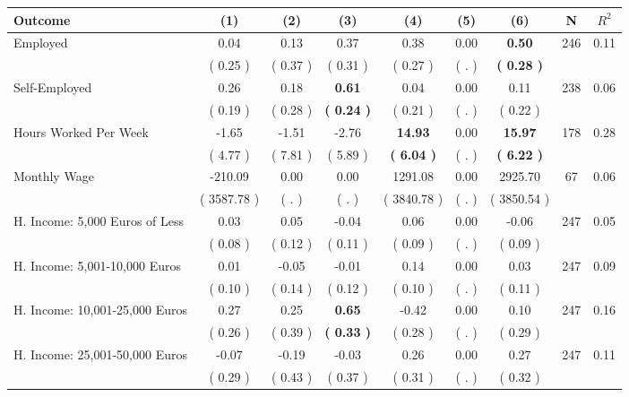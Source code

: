 \begin{tabular}{lcccccccc}
\toprule
 \textbf{Outcome} & \textbf{(1)} & \textbf{(2)} & \textbf{(3)} & \textbf{(4)} & \textbf{(5)} & \textbf{(6)} & \textbf{N} & \textbf{$ R^2$} \\
\midrule
Employed &      0.04 &      0.13 &      0.37 &      0.38 &      0.00 & \textbf{     0.50} & 246 &       0.11 \\ 
 & (     0.25 ) & (     0.37 ) & (     0.31 ) & (     0.27 ) & (        . ) & \textbf{(     0.28 )} & \\
Self-Employed &      0.26 &      0.18 & \textbf{     0.61} &      0.04 &      0.00 &      0.11 & 238 &       0.06 \\ 
 & (     0.19 ) & (     0.28 ) & \textbf{(     0.24 )} & (     0.21 ) & (        . ) & (     0.22 ) & \\
Hours Worked Per Week &     -1.65 &     -1.51 &     -2.76 & \textbf{    14.93} &      0.00 & \textbf{    15.97} & 178 &       0.28 \\ 
 & (     4.77 ) & (     7.81 ) & (     5.89 ) & \textbf{(     6.04 )} & (        . ) & \textbf{(     6.22 )} & \\
Monthly Wage &   -210.09 &      0.00 &      0.00 &   1291.08 &      0.00 &   2925.70 & 67 &       0.06 \\ 
 & (  3587.78 ) & (        . ) & (        . ) & (  3840.78 ) & (        . ) & (  3850.54 ) & \\
H. Income: 5,000 Euros of Less &      0.03 &      0.05 &     -0.04 &      0.06 &      0.00 &     -0.06 & 247 &       0.05 \\ 
 & (     0.08 ) & (     0.12 ) & (     0.11 ) & (     0.09 ) & (        . ) & (     0.09 ) & \\
H. Income: 5,001-10,000 Euros &      0.01 &     -0.05 &     -0.01 &      0.14 &      0.00 &      0.03 & 247 &       0.09 \\ 
 & (     0.10 ) & (     0.14 ) & (     0.12 ) & (     0.10 ) & (        . ) & (     0.11 ) & \\
H. Income: 10,001-25,000 Euros &      0.27 &      0.25 & \textbf{     0.65} &     -0.42 &      0.00 &      0.10 & 247 &       0.16 \\ 
 & (     0.26 ) & (     0.39 ) & \textbf{(     0.33 )} & (     0.28 ) & (        . ) & (     0.29 ) & \\
H. Income: 25,001-50,000 Euros &     -0.07 &     -0.19 &     -0.03 &      0.26 &      0.00 &      0.27 & 247 &       0.11 \\ 
 & (     0.29 ) & (     0.43 ) & (     0.37 ) & (     0.31 ) & (        . ) & (     0.32 ) & \\

\end{tabular}
